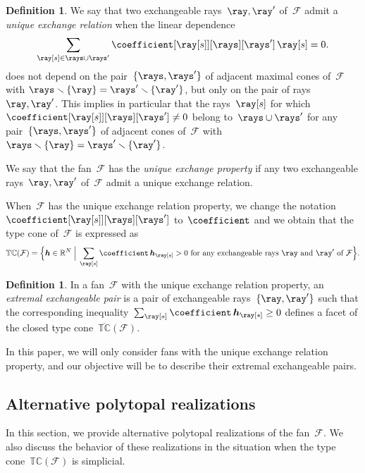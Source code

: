 \documentclass{amsart}
\theoremstyle{definition}
\newtheorem{definition}[theorem]{Definition}
\newcommand{\R}{\mathbb{R}} %
\renewcommand{\b}[1]{{\boldsymbol{#1}}} %
\newcommand{\Bigset}[2]{\Big\{ #1 \;\Big|\; #2 \Big\}} %
\newcommand{\ssm}{\smallsetminus} %
\newcommand{\darkblue}{\color{darkblue}} %
\newcommand{\defn}[1]{\textsl{\darkblue #1}} %
\newcommand{\Fan}{\mathcal{F}} %
\newcommand{\typeCone}{\mathbb{TC}} %
\newcommand{\ctypeCone}{\overline{\mathbb{TC}}} %
\begin{document}
\begin{definition}
\label{def:uerp}
We say that two exchangeable rays~$\ray, \ray'$ of~$\Fan$ admit a \defn{unique exchange relation} when the linear dependence
\[
\sum_{\ray[s] \in \rays \cup \rays'} \coefficient[{\ray[s]}][\rays][\rays'] \, \ray[s] = 0.
\]
does not depend on the pair~$\{\rays, \rays'\}$ of adjacent maximal cones of~$\Fan$ with $\rays \ssm \{\ray\} = \rays' \ssm \{\ray'\}$, but only on the pair of rays~$\ray, \ray'$.
This implies in particular that the rays~$\ray[s]$ for which~$\coefficient[{\ray[s]}][\rays][\rays'] \ne 0$ belong to~$\rays \cup \rays'$ for any pair~$\{\rays, \rays'\}$ of adjacent cones of~$\Fan$ with $\rays \ssm \{\ray\} = \rays' \ssm \{\ray'\}$. 

We say that the fan~$\Fan$ has the \defn{unique exchange property} if any two exchangeable rays~$\ray, \ray'$ of~$\Fan$ admit a unique exchange relation.
\end{definition}

When~$\Fan$ has the unique exchange relation property, we change the notation~$\coefficient[{\ray[s]}][\rays][\rays']$ to~$\coefficient$ and we obtain that the type cone of~$\Fan$ is expressed as
\[
\typeCone(\Fan) = \Bigset{\b{h} \in \R^N}{\sum_{\ray[s]} \coefficient \, \b{h}_{\ray[s]} > 0 \text{ for any exchangeable rays~$\ray$ and~$\ray'$ of~$\Fan$}}.
\]

\begin{definition}
In a fan~$\Fan$ with the unique exchange relation property, an \defn{extremal exchangeable pair} is a pair of exchangeable rays~$\{\ray,\ray'\}$ such that the corresponding inequality~${\sum_{\ray[s]} \coefficient \, \b{h}_{\ray[s]} \geq  0}$ defines a facet of the closed type cone~$\ctypeCone(\Fan)$.
\end{definition}

In this paper, we will only consider fans with the unique exchange relation property, and our objective will be to describe their extremal exchangeable pairs.


\subsection{Alternative polytopal realizations}

In this section, we provide alternative polytopal realizations of the fan~$\Fan$.
We also discuss the behavior of these realizations in the situation when the type cone~$\typeCone(\Fan)$ is simplicial.
\end{document}
